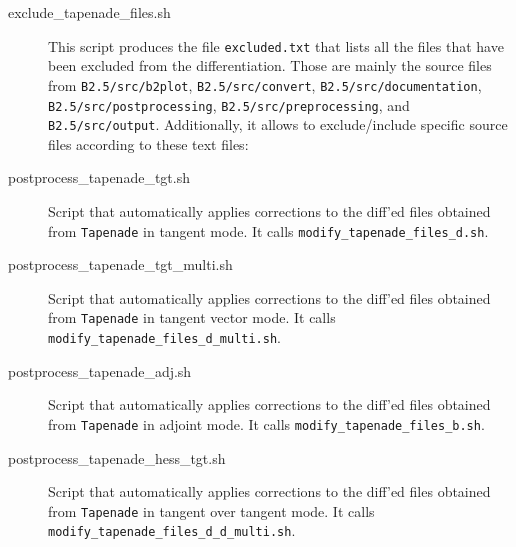 \begin{sloppypar}
\begin{description}
  \item[exclude\_tapenade\_files.sh] This script produces the file {\tt excluded.txt} that lists all the files that have been excluded from the differentiation. Those are mainly the source files from {\tt B2.5/src/b2plot}, {\tt B2.5/src/\allowbreak convert}, {\tt B2.5/src/documentation}, {\tt B2.5/src/postprocessing}, {\tt B2.5/src/preprocessing}, and {\tt B2.5/src/output}. Additionally, it allows to exclude/include specific source files according to these text files:

  \item[postprocess\_tapenade\_tgt.sh] Script that automatically applies corrections to the diff'ed files obtained from {\tt Tapenade} in tangent mode. It calls {\tt modify\_tapenade\_files\_d.sh}.

  \item[postprocess\_tapenade\_tgt\_multi.sh] Script that automatically applies corrections to the diff'ed files obtained from {\tt Tapenade} in tangent vector mode. It calls {\tt modify\_tapenade\_files\_d\_multi.sh}.

  \item[postprocess\_tapenade\_adj.sh] Script that automatically applies corrections to the diff'ed files obtained from {\tt Tapenade} in adjoint mode. It calls {\tt modify\_tapenade\_files\_b.sh}.

  \item[postprocess\_tapenade\_hess\_tgt.sh] Script that automatically applies corrections to the diff'ed files obtained from {\tt Tapenade} in tangent over tangent mode. It calls {\tt modify\_tapenade\_files\_d\_d\_multi.sh}.


\end{description}
\end{sloppypar}
